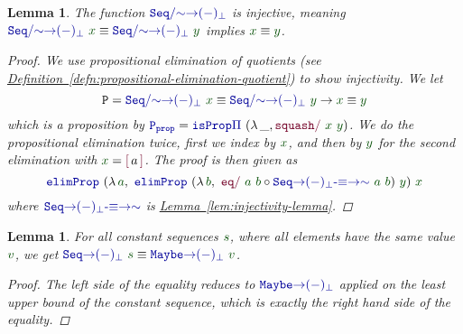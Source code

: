 \documentclass[twoside,11pt,openright]{report}
\theoremstyle{plain} %
\newtheorem{lem}[thm]{Lemma}
\theoremstyle{definition}
\theoremstyle{remark}
\newcommand*{\lemref}[1]{\hyperref[lem:#1]{Lemma~\ref*{lem:#1}}}
\newcommand*{\defref}[1]{\hyperref[defn:#1]{Definition~\ref*{defn:#1}}}
\newcommand*{\term}[1]{\textcolor{green!30!black}{#1}} %
\newcommand*{\function}[1]{\textcolor{blue!60!black}{\ensuremath{\mathtt{#1}}}}
\newcommand*{\constructor}[1]{\textcolor{purple!60!black}{\ensuremath{\mathtt{#1}}}}
\newcommand*{\typeformer}[1]{\ensuremath{\mathtt{#1}}}
\newcommand*{\quotientconstructor}[1]{\constructor{[}\,#1\,\constructor{]}}
\begin{document}
\begin{lem}
  \label{lem:sequence-to-partiality-monad-injectivity}
  The function \(\function{Seq/{\sim}{\rightarrow}(-)_\bot}\) is injective, meaning \(\function{Seq/{\sim}{\rightarrow}(-)_\bot}~\term{x} \equiv \function{Seq/{\sim}{\rightarrow}(-)_\bot}~\term{y}\) implies \(\term{x} \equiv \term{y}\).
  \begin{proof}
    We use propositional elimination of quotients (see \defref{propositional-elimination-quotient}) to show injectivity. We let
    \begin{equation}
      \typeformer{P} = \function{Seq/{\sim}{\rightarrow}(-)_\bot}~\term{x} \equiv \function{Seq/{\sim}{\rightarrow}(-)_\bot}~\term{y} \rightarrow \term{x} \equiv \term{y}
    \end{equation}
    which is a proposition by \(\function{P_{prop}} = \function{isProp\text{$\Pi$}}~(\lambda\,\_, \constructor{squash/}~\term{x}~\term{y})\). We do the propositional elimination twice, first we index by \(\term{x}\), and then by \(\term{y}\) for the second elimination with \(\term{x} = \quotientconstructor{a}\). The proof is then given as
    \begin{equation}
      \function{elimProp}~(\lambda\,\term{a},~\function{elimProp}~(\lambda\,\term{b},~\constructor{eq/}~\term{a}~\term{b} \circ \function{Seq{\rightarrow}(-)_\bot\text{-}{\equiv}{\rightarrow}{\sim}}~\term{a}~\term{b})~\term{y})~\term{x}
    \end{equation}
    where \(\function{Seq{\rightarrow}(-)_\bot\text{-}{\equiv}{\rightarrow}{\sim}}\) is \lemref{injectivity-lemma}.
  \end{proof}
\end{lem}
\begin{lem}
  \label{lem:constant-sequence-equality}
  For all constant sequences \(\term{s}\), where all elements have the same value \(\term{v}\), we get \(\function{Seq{\rightarrow}(-)_\bot}~\term{s} \equiv \function{Maybe{\rightarrow}(-)_\bot}~\term{v}\).
  \begin{proof}
    The left side of the equality reduces to \(\function{Maybe{\rightarrow}(-)_\bot}\) applied on the least upper bound of the constant sequence, which is exactly the right hand side of the equality.
  \end{proof}
\end{lem}
\end{document}
